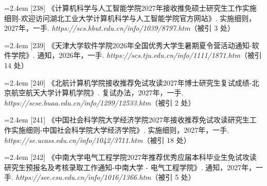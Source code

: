 {\vspace{3.5pt}\par
\nopagebreak\vspace{1pt}
\noindent\hangindent=2.4em \label{src:S0305}{\color{cAccent}[238]} 《计算机科学与人工智能学院2027年接收推免硕士研究生工作实施细则-欢迎访问湖北工业大学计算机科学与人工智能学院官方网站》. 实施细则，2027年，一手. \textit{https://scs.hbut.edu.cn/info/1039/8797.htm}（被引 3 处）\par
\vspace{0.6pt}
\vspace{3.5pt}\par
\nopagebreak\vspace{1pt}
\noindent\hangindent=2.4em \label{src:S0306}{\color{cAccent}[239]} 《天津大学软件学院2026年全国优秀大学生暑期夏令营活动通知-软件学院》. 通知，2026年，一手. \textit{https://scs.tju.edu.cn/info/1111/1871.htm}（被引 14 处）\par
\vspace{0.6pt}
\vspace{3.5pt}\par
\nopagebreak\vspace{1pt}
\noindent\hangindent=2.4em \label{src:S0307}{\color{cAccent}[240]} 《北航计算机学院接收推荐免试攻读2027年博士研究生复试成绩-北京航空航天大学计算机学院》. 复试办法，2027年，一手. \textit{https://scse.buaa.edu.cn/info/1299/12533.htm}（被引 2 处）\par
\vspace{0.6pt}
\vspace{3.5pt}\par
\nopagebreak\vspace{1pt}
\noindent\hangindent=2.4em \label{src:S0308}{\color{cAccent}[241]} 《中国社会科学院大学经济学院2027年接收推荐免试攻读研究生工作实施细则-中国社会科学院大学经济学院》. 实施细则，2027年，一手. \textit{https://se.ucass.edu.cn/info/1042/3711.htm}（被引 18 处）\par
\vspace{0.6pt}
\vspace{3.5pt}\par
\nopagebreak\vspace{1pt}
\noindent\hangindent=2.4em \label{src:S0309}{\color{cAccent}[242]} 《中南大学电气工程学院2027年推荐优秀应届本科毕业生免试攻读研究生预报名及考核录取工作通知-中南大学 - 电气工程学院》. 通知，2027年，一手. \textit{https://see.csu.edu.cn/info/1016/1366.htm}（被引 5 处）\par
}
